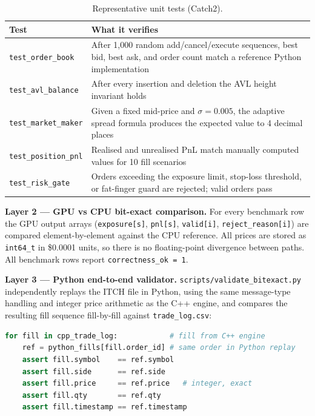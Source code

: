 \documentclass[12pt]{article}
\begin{document}
\begin{table}[H]
\centering
\small
\caption{Representative unit tests (Catch2).}
\label{tab:unit_tests}
\begin{tabularx}{\textwidth}{@{}p{3.8cm}X@{}}
\toprule
\textbf{Test} & \textbf{What it verifies} \\
\midrule
\texttt{test\_order\_book} &
  After 1{,}000 random add/cancel/execute sequences, best bid, best ask,
  and order count match a reference Python implementation \\[2pt]
\texttt{test\_avl\_balance} &
  After every insertion and deletion the AVL height invariant holds \\[2pt]
\texttt{test\_market\_maker} &
  Given a fixed mid-price and $\sigma = 0.005$, the adaptive spread
  formula produces the expected value to 4 decimal places \\[2pt]
\texttt{test\_position\_pnl} &
  Realised and unrealised PnL match manually computed values for
  10 fill scenarios \\[2pt]
\texttt{test\_risk\_gate} &
  Orders exceeding the exposure limit, stop-loss threshold, or
  fat-finger guard are rejected; valid orders pass \\
\bottomrule
\end{tabularx}
\end{table}

\textbf{Layer 2 --- GPU vs CPU bit-exact comparison.}
For every benchmark row the GPU output arrays (\texttt{exposure[s]},
\texttt{pnl[s]}, \texttt{valid[i]}, \texttt{reject\_reason[i]}) are
compared element-by-element against the CPU reference.
All prices are stored as \texttt{int64\_t} in \$0.0001 units,
so there is no floating-point divergence between paths.
All benchmark rows report \texttt{correctness\_ok = 1}.

\textbf{Layer 3 --- Python end-to-end validator.}
\texttt{scripts/validate\_bitexact.py} independently replays the ITCH
file in Python, using the same message-type handling and integer price
arithmetic as the C++ engine, and compares the resulting fill sequence
fill-by-fill against \texttt{trade\_log.csv}:

\begin{lstlisting}[language=Python, caption={Bit-exact validation loop.},
                   label={lst:validate}]
for fill in cpp_trade_log:            # fill from C++ engine
    ref = python_fills[fill.order_id] # same order in Python replay
    assert fill.symbol    == ref.symbol
    assert fill.side      == ref.side
    assert fill.price     == ref.price   # integer, exact
    assert fill.qty       == ref.qty
    assert fill.timestamp == ref.timestamp
\end{lstlisting}
\end{document}
